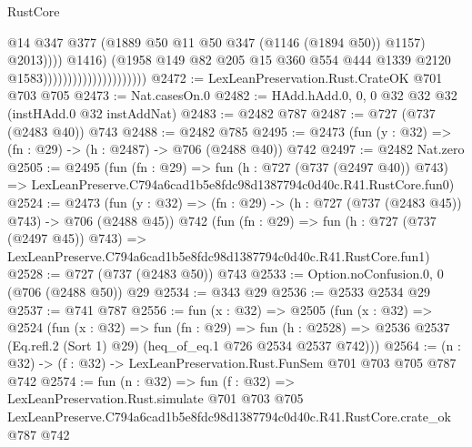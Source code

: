 \begin{lexlean}{RustCore}
\begin{coremodule}
                                                      @14
                                                      @347
                                                      @377
                                                      (@1889
                                                        @50
                                                        @11
                                                        @50
                                                        @347
                                                        (@1146 (@1894 @50))
                                                        @1157)
                                                      @2013))))
                                              @1416)
                                            (@1958
                                              @149
                                              @82
                                              @205
                                              @15
                                              @360
                                              @554
                                              @444
                                              @1339
                                              @2120
                                              @1583)))))))))))))))))))))
@2472 := LexLeanPreservation.Rust.CrateOK @701 @703 @705
@2473 := Nat.casesOn.{0}
@2482 := HAdd.hAdd.{0, 0, 0} @32 @32 @32 (instHAdd.{0} @32 instAddNat)
@2483 := @2482 @787
@2487 := @727 (@737 (@2483 @40)) @743
@2488 := @2482 @785
@2495 := @2473 (fun (y : @32) => (fn : @29) -> (h : @2487) -> @706 (@2488 @40)) @742
@2497 := @2482 Nat.zero
@2505 := @2495
    (fun (fn : @29) =>
    fun (h : @727 (@737 (@2497 @40)) @743) =>
    LexLeanPreserve.C794a6cad1b5e8fdc98d1387794c0d40c.R41.RustCore.fun0)
@2524 := @2473
    (fun (y : @32) => (fn : @29) -> (h : @727 (@737 (@2483 @45)) @743) -> @706 (@2488 @45))
    @742
    (fun (fn : @29) =>
    fun (h : @727 (@737 (@2497 @45)) @743) =>
    LexLeanPreserve.C794a6cad1b5e8fdc98d1387794c0d40c.R41.RustCore.fun1)
@2528 := @727 (@737 (@2483 @50)) @743
@2533 := Option.noConfusion.{0, 0} (@706 (@2488 @50)) @29
@2534 := @343 @29
@2536 := @2533 @2534 @29
@2537 := @741 @787
@2556 := fun (x : @32) =>
  @2505
    (fun (x : @32) =>
    @2524
      (fun (x : @32) =>
      fun (fn : @29) =>
      fun (h : @2528) =>
      @2536 @2537 (Eq.refl.{2} (Sort 1) @29) (heq_of_eq.{1} @726 @2534 @2537 @742)))
@2564 := (n : @32) -> (f : @32) -> LexLeanPreservation.Rust.FunSem @701 @703 @705 @787 @742
@2574 := fun (n : @32) =>
  fun (f : @32) =>
  LexLeanPreservation.Rust.simulate
    @701
    @703
    @705
    LexLeanPreserve.C794a6cad1b5e8fdc98d1387794c0d40c.R41.RustCore.crate_ok
    @787
    @742
\end{coremodule}
\end{lexlean}
